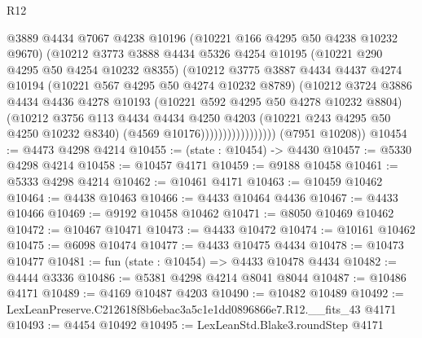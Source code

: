 \begin{lexlean}{R12}
\begin{coremodule}
                              @3889
                              @4434
                              @7067
                              @4238
                              @10196
                              (@10221 @166 @4295 @50 @4238 @10232 @9670)
                              (@10212
                                @3773
                                @3888
                                @4434
                                @5326
                                @4254
                                @10195
                                (@10221 @290 @4295 @50 @4254 @10232 @8355)
                                (@10212
                                  @3775
                                  @3887
                                  @4434
                                  @4437
                                  @4274
                                  @10194
                                  (@10221 @567 @4295 @50 @4274 @10232 @8789)
                                  (@10212
                                    @3724
                                    @3886
                                    @4434
                                    @4436
                                    @4278
                                    @10193
                                    (@10221 @592 @4295 @50 @4278 @10232 @8804)
                                    (@10212
                                      @3756
                                      @113
                                      @4434
                                      @4434
                                      @4250
                                      @4203
                                      (@10221 @243 @4295 @50 @4250 @10232 @8340)
                                      (@4569 @10176)))))))))))))))))
      (@7951 @10208))
@10454 := @4473 @4298 @4214
@10455 := (state : @10454) -> @4430
@10457 := @5330 @4298 @4214
@10458 := @10457 @4171
@10459 := @9188 @10458
@10461 := @5333 @4298 @4214
@10462 := @10461 @4171
@10463 := @10459 @10462
@10464 := @4438 @10463
@10466 := @4433 @10464 @4436
@10467 := @4433 @10466
@10469 := @9192 @10458 @10462
@10471 := @8050 @10469 @10462
@10472 := @10467 @10471
@10473 := @4433 @10472
@10474 := @10161 @10462
@10475 := @6098 @10474
@10477 := @4433 @10475 @4434
@10478 := @10473 @10477
@10481 := fun (state : @10454) => @4433 @10478 @4434
@10482 := @4444 @3336
@10486 := @5381 @4298 @4214 @8041 @8044
@10487 := @10486 @4171
@10489 := @4169 @10487 @4203
@10490 := @10482 @10489
@10492 := LexLeanPreserve.C212618f8b6ebac3a5c1e1dd0896866e7.R12.__fits_43 @4171
@10493 := @4454 @10492
@10495 := LexLeanStd.Blake3.roundStep @4171

\end{coremodule}
\end{lexlean}
